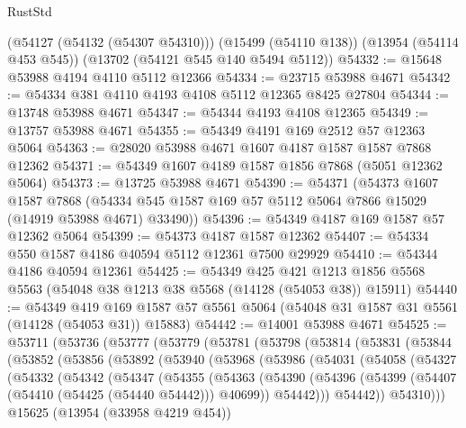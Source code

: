 \begin{lexlean}{RustStd}
\begin{coremodule}
    (@54127 (@54132 (@54307 @54310)))
    (@15499 (@54110 @138))
    (@13954 (@54114 @453 @545))
    (@13702 (@54121 @545 @140 @5494 @5112))
@54332 := @15648 @53988 @4194 @4110 @5112 @12366
@54334 := @23715 @53988 @4671
@54342 := @54334 @381 @4110 @4193 @4108 @5112 @12365 @8425 @27804
@54344 := @13748 @53988 @4671
@54347 := @54344 @4193 @4108 @12365
@54349 := @13757 @53988 @4671
@54355 := @54349 @4191 @169 @2512 @57 @12363 @5064
@54363 := @28020 @53988 @4671 @1607 @4187 @1587 @1587 @7868 @12362
@54371 := @54349 @1607 @4189 @1587 @1856 @7868 (@5051 @12362 @5064)
@54373 := @13725 @53988 @4671
@54390 := @54371
    (@54373
      @1607
      @1587
      @7868
      (@54334 @545 @1587 @169 @57 @5112 @5064 @7866 @15029 (@14919 @53988 @4671) @33490))
@54396 := @54349 @4187 @169 @1587 @57 @12362 @5064
@54399 := @54373 @4187 @1587 @12362
@54407 := @54334 @550 @1587 @4186 @40594 @5112 @12361 @7500 @29929
@54410 := @54344 @4186 @40594 @12361
@54425 := @54349
    @425
    @421
    @1213
    @1856
    @5568
    @5563
    (@54048 @38 @1213 @38 @5568 (@14128 (@54053 @38)) @15911)
@54440 := @54349
    @419
    @169
    @1587
    @57
    @5561
    @5064
    (@54048 @31 @1587 @31 @5561 (@14128 (@54053 @31)) @15883)
@54442 := @14001 @53988 @4671
@54525 := @53711
    (@53736
      (@53777
        (@53779
          (@53781
            (@53798
              (@53814
                (@53831
                  (@53844
                    (@53852
                      (@53856
                        (@53892
                          (@53940
                            (@53968
                              (@53986
                                (@54031
                                  (@54058
                                    (@54327
                                      (@54332
                                        (@54342
                                          (@54347
                                            (@54355
                                              (@54363
                                                (@54390
                                                  (@54396
                                                    (@54399
                                                      (@54407
                                                        (@54410 (@54425 (@54440 @54442)))
                                                        @40699))
                                                    @54442)))
                                              @54442))
                                          @54310)))
                                    @15625
                                    (@13954 (@33958 @4219 @454))

\end{coremodule}
\end{lexlean}
